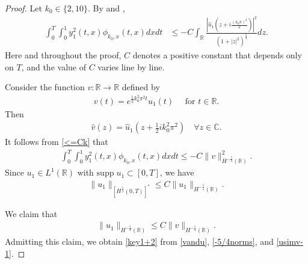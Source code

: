 \documentclass[11pt, reqno]{amsart}
\theoremstyle{plain}
\numberwithin{equation}{section}
\newcommand{\mR}{\mathbb{R}}
\newcommand{\mC}{\mathbb{C}}
\newcommand{\hu}{\hat u}
\begin{document}
\begin{proof} Let $k_0 \in \{2,10\}$.
By  and ,
    \begin{align}   \label{<=Ck}
     \int_0^T \int_0^1 y_1^2(t, x) \phi_{k_0, x}(t, x) dx dt &\leq - C  \int_{\mathbb{R}} \frac{\left|\hu_1\left(z + i \frac{({k_0} \pi)^2}{2} \right) \right|^2}{\left(1 + |z|^2 \right)^{\frac{5}{4}}} dz. 
    \end{align}
Here and throughout the proof, $C$ denotes a positive constant that depends only on $T$, and the value of $C$ varies line by line.  
   
 Consider the function  $v: \mathbb{R} \to \mathbb{R}$ defined by 
        \begin{align}	\label{def-v}
 v(t) = e^{\frac{1}{2} k_0^2 \pi^2 t}  u_1(t)  \quad \mbox{ for } t \in \mR. 
        \end{align}
    Then 
    \begin{align*}
    		\hat{v}(z) = \hu_1 \left(z + \frac{1}{2} i k_0^2 \pi^2 \right) \quad \forall z \in \mC.
    \end{align*} 
 It follows from \eqref{<=Ck}  that 
\begin{align}   \label{vandu}
        \int_0^T \int_0^1 y_1^2(t, x) \phi_{k_0, x}(t, x) dx dt  \leq -C \|v\|^2_{H^{-\frac{5}{4}}(\mR)}.
    \end{align}
Since $u_1 \in L^1(\mR)$ with $\mathrm{supp} \; u_1 \subset [0,T]$, we have 
\begin{align}	\label{-5/4norms}
	\| u_1\|_{[H^{\frac{5}{4}}(0, T)]^*} \leq C \|u_1\|_{H^{-\frac{5}{4}}(\mR)}.
\end{align}

We claim that
\begin{align}	\label{usimv-1}
\|u_1 \|_{H^{-\frac{5}{4}}(\mathbb{R})} \leq C \|v\|_{H^{-\frac{5}{4}}(\mathbb{R})}.
\end{align}
Admitting this claim, we obtain \eqref{key1+2} from \eqref{vandu}, \eqref{-5/4norms}, and \eqref{usimv-1}.


\end{proof}
\end{document}
